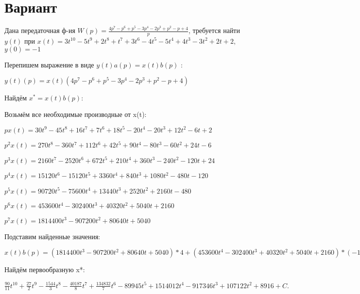 \documentclass{article}
\begin{document}
\section{Вариант}

Дана передаточная ф-ия $W(p)=\frac{4p^{7}-p^{6}+p^{5}-3p^{4}-2p^{3}+p^{2}-p+4}{p}$, требуется найти $y(t)$ при $x(t)=3t^{10}-5t^{9}+2t^{8}+t^{7}+3t^{6}-4t^{5}-5t^{4}+4t^{3}-3t^{2}+2t+2$, $y(0)=-1$

Перепишем выражение в виде $y(t)a(p)=x(t)b(p)$ :

$y(t)(p)=x(t)(4p^{7}-p^{6}+p^{5}-3p^{4}-2p^{3}+p^{2}-p+4)$

Найдём $x^*=x(t)b(p)$:

Возьмём все необходимые производные от x(t):

$px(t)=30t^{9}-45t^{8}+16t^{7}+7t^{6}+18t^{5}-20t^{4}-20t^{3}+12t^{2}-6t+2$

$p^2x(t)=270t^{8}-360t^{7}+112t^{6}+42t^{5}+90t^{4}-80t^{3}-60t^{2}+24t-6$

$p^3x(t)=2160t^{7}-2520t^{6}+672t^{5}+210t^{4}+360t^{3}-240t^{2}-120t+24$

$p^4x(t)=15120t^{6}-15120t^{5}+3360t^{4}+840t^{3}+1080t^{2}-480t-120$

$p^5x(t)=90720t^{5}-75600t^{4}+13440t^{3}+2520t^{2}+2160t-480$

$p^6x(t)=453600t^{4}-302400t^{3}+40320t^{2}+5040t+2160$

$p^7x(t)=1814400t^{3}-907200t^{2}+80640t+5040$

Подставим найденные значения:

$x(t)b(p) = (1814400t^{3}-907200t^{2}+80640t+5040)*4+(453600t^{4}-302400t^{3}+40320t^{2}+5040t+2160)*(-1)+(90720t^{5}-75600t^{4}+13440t^{3}+2520t^{2}+2160t-480)*1+(15120t^{6}-15120t^{5}+3360t^{4}+840t^{3}+1080t^{2}-480t-120)*(-3)+(2160t^{7}-2520t^{6}+672t^{5}+210t^{4}+360t^{3}-240t^{2}-120t+24)*(-2)+(270t^{8}-360t^{7}+112t^{6}+42t^{5}+90t^{4}-80t^{3}-60t^{2}+24t-6)*1+(30t^{9}-45t^{8}+16t^{7}+7t^{6}+18t^{5}-20t^{4}-20t^{3}+12t^{2}-6t+2)*(-1)+(30t^{9}-45t^{8}+16t^{7}+7t^{6}+18t^{5}-20t^{4}-20t^{3}+12t^{2}-6t+2)*4=90t^{9}+135t^{8}-4632t^{7}-40187t^{6}+134832t^{5}-539670t^{4}+7570060t^{3}-3669384t^{2}+321366t$





Найдём первообразную x*:

$\frac{90}{11}t^{10}+\frac{27}{2}t^{9}-\frac{1544}{3}t^{8}-\frac{40187}{8}t^{7}+\frac{134832}{7}t^{6}-89945t^{5}+1514012t^{4}-917346t^{3}+107122t^{2}+8916+C.$
\end{document}
